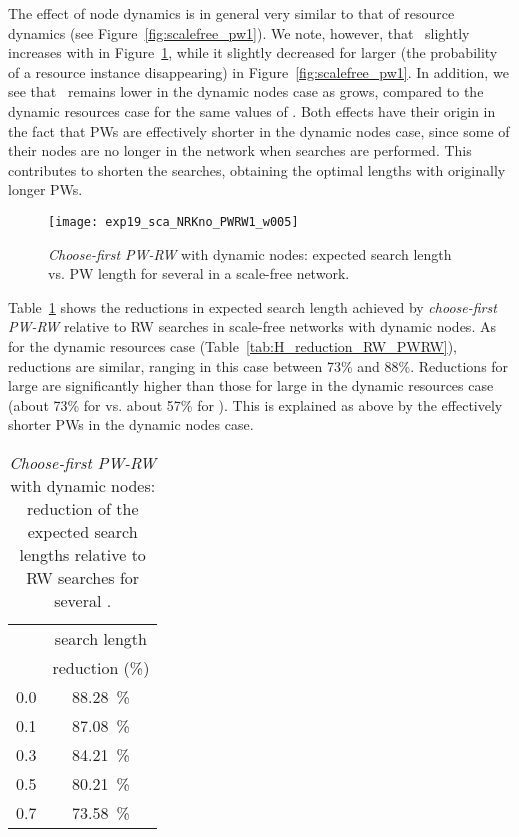\documentclass[]{elsarticle}
\begin{document}
The effect of node dynamics is in general very similar to that of resource dynamics (see Figure~\ref{fig:scalefree_pw1}). We note, however, that \sopt\ slightly increases with  in Figure~\ref{fig:scalefree_pw1_dynnodes}, while it slightly decreased for larger  (the probability of a resource instance disappearing) in Figure~\ref{fig:scalefree_pw1}. In addition, we see that \Lexpopt\ remains lower in the dynamic nodes case as  grows, compared to the dynamic resources case for the same values of . Both effects have their origin in the fact that PWs are effectively shorter in the dynamic nodes case, since some of their nodes are no longer in the network when searches are performed. This contributes to shorten the searches, obtaining the optimal lengths with originally longer PWs.

\begin{figure}
 \centering
 \texttt{[image: exp19\_sca\_NRKno\_PWRW1\_w005]}
 \caption{\emph{Choose-first PW-RW} with dynamic nodes: expected search length  vs. PW length  for several  in a scale-free network.}
 \label{fig:scalefree_pw1_dynnodes}
\end{figure}

Table~\ref{tab:H_reduction_RW_PWRW_dynnodes} shows the reductions in expected search length achieved by \emph{choose-first PW-RW} relative to RW searches in scale-free networks with dynamic nodes. As for the dynamic resources case (Table~\ref{tab:H_reduction_RW_PWRW}), reductions are similar, ranging in this case between 73\% and 88\%. Reductions for large  are significantly higher than those for large  in the dynamic resources case (about 73\% for  vs. about 57\% for ). This is explained as above by the effectively shorter PWs in the dynamic nodes case.
\begin{table}
\centering
\begin{tabular}{|c|c|}
\hline
\rule{0pt}{11pt}   & search length \\ 
                & reduction (\%)\\ \hline
              0.0  &  88.28~\% \\
              0.1  &  87.08~\% \\
              0.3  &  84.21~\% \\
              0.5  &  80.21~\% \\
              0.7  &  73.58~\% \\
\hline
\end{tabular}
\caption{\emph{Choose-first PW-RW} with dynamic nodes: reduction of the expected search lengths relative to RW searches for several .}
\label{tab:H_reduction_RW_PWRW_dynnodes}
\end{table}
\end{document}
